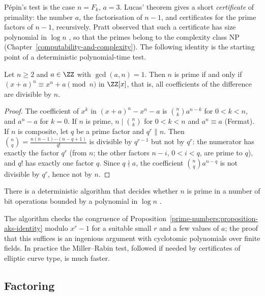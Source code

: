 P\'epin's test is the case $n = F_k$, $a = 3$. Lucas' theorem gives a short \emph{certificate} of primality: the number $a$, the factorisation of $n - 1$, and certificates for the prime factors of
$n - 1$, recursively. Pratt observed that such a certificate has size polynomial in $\log n$ \cite{pratt-certificates}, so that the primes belong to the complexity class NP (Chapter~\ref{computability-and-complexity}). The
following identity is the starting point of a deterministic polynomial-time test.

\begin{proposition}\label{prime-numbers:proposition-aks-identity}
Let $n \geq 2$ and $a \in \ZZ$ with $\gcd(a, n) = 1$. Then $n$ is prime if and only if $(x + a)^n \equiv x^n + a \pmod n$ in $\ZZ[x]$, that is, all coefficients of the difference are divisible by $n$.
\end{proposition}

\begin{proof}
The coefficient of $x^k$ in $(x + a)^n - x^n - a$ is $\binom{n}{k}a^{n-k}$ for $0 < k < n$, and $a^n - a$ for $k = 0$. If $n$ is prime, $n \mid \binom{n}{k}$ for $0 < k < n$ and $a^n \equiv a$ (Fermat).
If $n$ is composite, let $q$ be a prime factor and $q^r \parallel n$. Then $\binom{n}{q} = \frac{n(n - 1) \cdots (n - q + 1)}{q!}$ is divisible by $q^{r-1}$ but not by $q^r$: the numerator has exactly
the factor $q^r$ (from $n$; the other factors $n - i$, $0 < i < q$, are prime to $q$), and $q!$ has exactly one factor $q$. Since $q \nmid a$, the coefficient $\binom{n}{q}a^{n-q}$ is not divisible by
$q^r$, hence not by $n$.
\end{proof}

\begin{theorem}\label{prime-numbers:theorem-aks}
There is a deterministic algorithm that decides whether $n$ is prime in a number of bit operations bounded by a polynomial in $\log n$ \cite{agrawal-kayal-saxena}.
\end{theorem}

The algorithm checks the congruence of Proposition~\ref{prime-numbers:proposition-aks-identity} modulo $x^r - 1$ for a suitable small $r$ and a few values of $a$; the proof that this suffices is
an ingenious argument with cyclotomic polynomials over finite fields. In practice the Miller--Rabin test, followed if needed by certificates of elliptic curve type, is much faster.

\subsection{Factoring}\label{prime-numbers:subsection-factoring}

